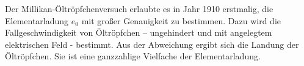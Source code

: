 Der Millikan-Öltröpfchenversuch erlaubte es in Jahr 1910 erstmalig, die Elementarladung $e_0$ mit großer Genauigkeit zu bestimmen. Dazu wird die Fallgeschwindigkeit von Öltröpfchen -- ungehindert und mit angelegtem elektrischen Feld -  bestimmt. Aus der Abweichung ergibt sich die Landung der Öltröpfchen. Sie ist eine ganzzahlige Vielfache der Elementarladung.